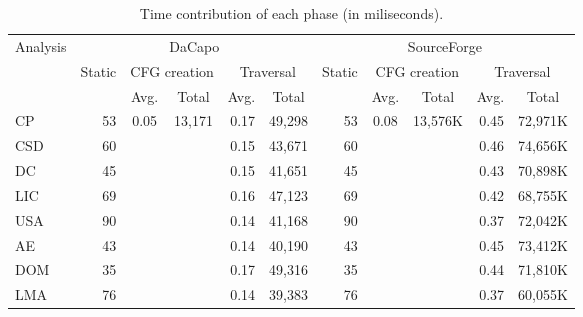 \begin{table}[t]
	\centering
	\scriptsize
	\caption{Time contribution of each phase (in miliseconds).}
\begin{tabular}{rrccrrrccrr}
\toprule
\multicolumn{1}{c}{Analysis} & \multicolumn{5}{c}{DaCapo}            & \multicolumn{5}{c}{SourceForge} \\
\cmidrule(lr){2-6} \cmidrule(lr){7-11}
\multicolumn{1}{c}{} & \multicolumn{1}{c}{Static} & \multicolumn{2}{c}{CFG creation} & \multicolumn{2}{c}{Traversal} & \multicolumn{1}{c}{Static} & \multicolumn{2}{c}{CFG creation} & \multicolumn{2}{c}{Traversal} \\
\cmidrule(lr){3-4} \cmidrule(lr){5-6} \cmidrule(lr){8-9} \cmidrule(lr){10-11}
\multicolumn{1}{c}{} & \multicolumn{1}{c}{} & Avg.  & Total & \multicolumn{1}{c}{Avg.} & \multicolumn{1}{c}{Total} & \multicolumn{1}{c}{} & Avg.  & Total & \multicolumn{1}{c}{Avg.} & \multicolumn{1}{c}{Total} \\
\midrule
\multicolumn{1}{l}{CP} &          53  & \multirow{18}{*}{0.05} & \multirow{18}{*}{13,171} &    0.17  &          49,298  &               53  & \multirow{18}{*}{0.08} & \multirow{18}{*}{13,576K} &           0.45  &      72,971K  \\
\multicolumn{1}{l}{CSD} &          60  &       &       &    0.15  &          43,671  &               60  &       &       &           0.46  &      74,656K  \\
\multicolumn{1}{l}{DC} &          45  &       &       &    0.15  &          41,651  &               45  &       &       &           0.43  &      70,898K  \\
\multicolumn{1}{l}{LIC} &          69  &       &       &    0.16  &          47,123  &               69  &       &       &           0.42  &      68,755K  \\
\multicolumn{1}{l}{USA} &          90  &       &       &    0.14  &          41,168  &               90  &       &       &           0.37  &      72,042K  \\
\multicolumn{1}{l}{AE} &          43  &       &       &    0.14  &          40,190  &               43  &       &       &           0.45  &      73,412K  \\
\multicolumn{1}{l}{DOM} &          35  &       &       &    0.17  &          49,316  &               35  &       &       &           0.44  &      71,810K  \\
\multicolumn{1}{l}{LMA} &          76  &       &       &    0.14  &          39,383  &               76  &       &       &           0.37  &      60,055K  \\

\end{tabular}
\end{table}
